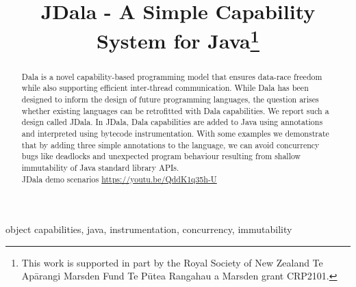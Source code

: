 \documentclass[conference]{IEEEtran}
\newcommand{\dala}{Dala\xspace}
\newcommand{\jdala}{JDala\xspace}
\begin{document}
\title{JDala - A Simple Capability System for Java\thanks{This work is supported in part by the Royal Society of New
  Zealand Te Ap\={a}rangi Marsden Fund Te P\={u}tea Rangahau a Marsden
  grant CRP2101.}
}


\author{
}
\maketitle

\begin{abstract}
\dala is a novel capability-based programming model that ensures data-race freedom while also supporting efficient inter-thread communication. While \dala has been designed to inform the design of future programming languages, the question arises whether existing languages can be retrofitted with \dala capabilities. We report such a design called \jdala. In \jdala,  \dala capabilities are added to Java using annotations and interpreted using bytecode instrumentation. With some examples we demonstrate that by adding three simple annotations to the language, we can avoid concurrency bugs like deadlocks and unexpected program behaviour resulting from shallow immutability of Java standard library APIs. \\
\jdala demo scenarios \url{https://youtu.be/QddK1q35h-U}
\end{abstract}

\begin{IEEEkeywords}
object capabilities, java, instrumentation, concurrency, immutability 
\end{IEEEkeywords}

















\end{document}
